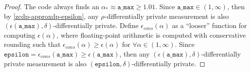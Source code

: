 \begin{proof}
The code always finds an $\alpha_{*} \approx \texttt{a\_max} \geq 1.01$.
Since $\texttt{a\_max} \in (1, \infty)$, then by \ref{zcdp-approxdp-epsilon}, any $\rho$-differentially private measurement is also $(\epsilon(\texttt{a\_max}), \delta)$-differentially private.
Define $\epsilon_{cons}(\alpha)$ as a ``looser'' function for computing $\epsilon(\alpha)$, 
where floating-point arithmetic is computed with conservative rounding such that $\epsilon_{cons}(\alpha) \geq \epsilon(\alpha)$ for $\forall \alpha \in (1, \infty)$.
Since $\texttt{epsilon} = \epsilon_{cons}(\texttt{a\_max}) \geq \epsilon(\texttt{a\_max})$, then any $(\epsilon(\texttt{a\_max}), \delta)$-differentially private measurement is also $(\texttt{epsilon}, \delta)$-differentially private.
\end{proof}





